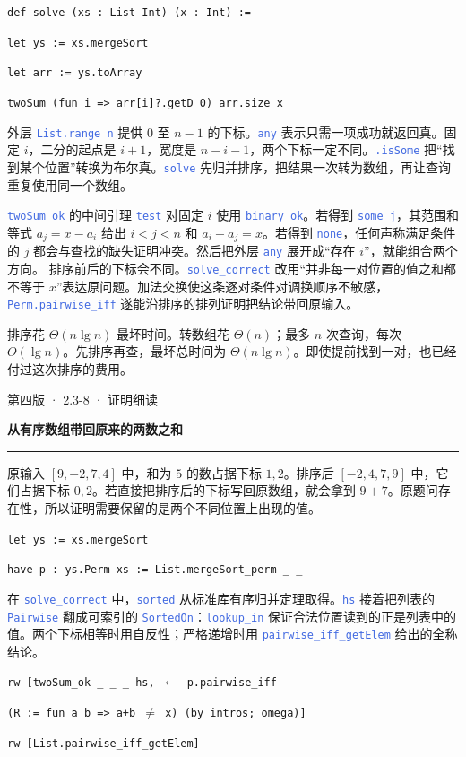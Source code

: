 \documentclass[UTF8,11pt,a4paper,fontset=fandol]{ctexart}
\newcommand{\HandoutLesson}[2]{%
  \par{\small\heiti\color{BrickRed}#1}\par\vspace{3pt}
  {\fontsize{21}{27}\selectfont\heiti\bfseries #2}\par
  \textcolor{BrickRed}{\rule{\linewidth}{.7pt}}\par}
\newcommand{\src}[1]{\textcolor{RoyalBlue}{\texttt{#1}}}
\newcommand{\subhead}[1]{\par\vspace{3pt}{\heiti\bfseries\color{RoyalBlue}#1}\par}
\newenvironment{leanblock}{\par\smallskip\noindent\begin{lrbox}{\leanbox}\begin{minipage}{\dimexpr\linewidth-12pt\relax}\raggedright\small\setlength{\parskip}{0pt}}{\end{minipage}\end{lrbox}\colorbox{RoyalBlue!6}{\usebox{\leanbox}}\par\smallskip}
\newcommand{\lineofcode}[2]{\noindent\hspace*{#1em}\strut\texttt{#2}\par}
\begin{document}
\begin{leanblock}
\lineofcode{0.0}{def solve (xs : List Int) (x : Int) :=}
\lineofcode{0.9}{let ys := xs.mergeSort}
\lineofcode{0.9}{let arr := ys.toArray}
\lineofcode{0.9}{twoSum (fun i => arr[i]?.getD 0) arr.size x}
\end{leanblock}
外层 \src{List.range n} 提供 $0$ 至 $n-1$ 的下标。\src{any} 表示只需一项成功就返回真。固定 $i$，二分的起点是 $i+1$，宽度是 $n-i-1$，两个下标一定不同。\src{.isSome} 把“找到某个位置”转换为布尔真。\src{solve} 先归并排序，把结果一次转为数组，再让查询重复使用同一个数组。
\subhead{正反两个方向都要检查}
\src{twoSum\_ok} 的中间引理 \src{test} 对固定 $i$ 使用 \src{binary\_ok}。若得到 \src{some j}，其范围和等式 $a_j=x-a_i$ 给出 $i<j<n$ 和 $a_i+a_j=x$。若得到 \src{none}，任何声称满足条件的 $j$ 都会与查找的缺失证明冲突。然后把外层 \src{any} 展开成“存在 $i$”，就能组合两个方向。
排序前后的下标会不同。\src{solve\_correct} 改用“并非每一对位置的值之和都不等于 $x$”表达原问题。加法交换使这条逐对条件对调换顺序不敏感，\src{Perm.pairwise\_iff} 遂能沿排序的排列证明把结论带回原输入。
\subhead{时间从哪里来}
排序花 $\Theta(n\lg n)$ 最坏时间。转数组花 $\Theta(n)$；最多 $n$ 次查询，每次 $O(\lg n)$。先排序再查，最坏总时间为 $\Theta(n\lg n)$。即使提前找到一对，也已经付过这次排序的费用。
\par{}
\clearpage{}\label{p40}\HandoutLesson{第四版 · 2.3-8 · 证明细读}{从有序数组带回原来的两数之和}
原输入 $[9,-2,7,4]$ 中，和为 $5$ 的数占据下标 $1,2$。排序后 $[-2,4,7,9]$ 中，它们占据下标 $0,2$。若直接把排序后的下标写回原数组，就会拿到 $9+7$。原题问存在性，所以证明需要保留的是两个不同位置上出现的值。
\begin{leanblock}
\lineofcode{0.0}{let ys := xs.mergeSort}
\lineofcode{0.0}{have p : ys.Perm xs := List.mergeSort\_perm \_ \_}
\end{leanblock}
在 \src{solve\_correct} 中，\src{sorted} 从标准库有序归并定理取得。\src{hs} 接着把列表的 \src{Pairwise} 翻成可索引的 \src{SortedOn}：\src{lookup\_in} 保证合法位置读到的正是列表中的值。两个下标相等时用自反性；严格递增时用 \src{pairwise\_iff\_getElem} 给出的全称结论。
\begin{leanblock}
\lineofcode{0.0}{rw [twoSum\_ok \_ \_ \_ hs, \ensuremath{\leftarrow} p.pairwise\_iff}
\lineofcode{0.9}{(R := fun a b => a+b \ensuremath{\ne} x) (by intros; omega)]}
\lineofcode{0.0}{rw [List.pairwise\_iff\_getElem]}
\end{leanblock}
\end{document}
